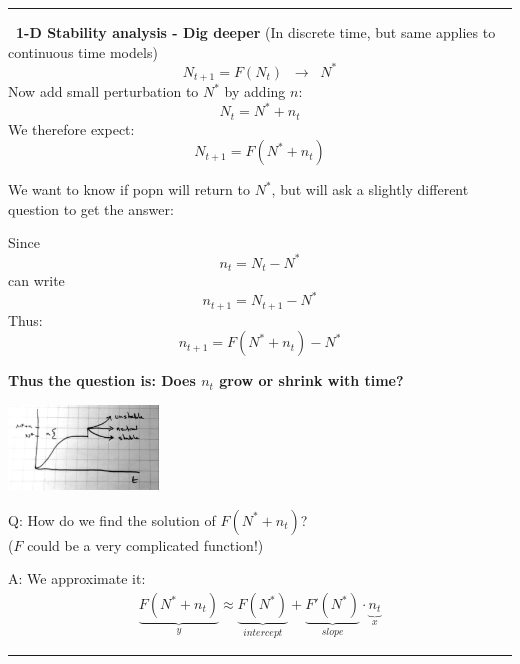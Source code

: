 \documentclass{article}
\newcommand{\ind}{\-\hspace{1cm}}
\begin{document}
\rule[0.5ex]{\linewidth}{1pt}

\textbf{ 1-D Stability analysis - Dig deeper}
(In discrete time, but same applies to continuous time models)
\begin{equation*}
	N_{t+1}=F(N_t) \; \; \to \;\; N^*
\end{equation*}
Now add small perturbation to $N^*$ by adding $n$:
\begin{equation*}
	N_t = N^* + n_t
\end{equation*}
We therefore expect:
\begin{equation*}
	N_{t+1} = F(N^* + n_t)
\end{equation*}

We want to know if popn will return to $N^*$, but will ask a slightly different question to get the answer:

\vspace{0.5cm}

Since 
\begin{equation*}
	n_t=N_t-N^*
\end{equation*}
can write
\begin{equation*}
	n_{t+1}=N_{t+1}-N^*
\end{equation*}
Thus:
\begin{equation*}
	n_{t+1} = F(N^* + n_t) - N^*
\end{equation*}

\begin{center}
	\textbf{Thus the question is:  Does $n_t$ grow or shrink with time?}
\end{center}

\begin{center}
\includegraphics[width=4cm]{figs/Perturb.pdf}
\end{center}

Q: How do we find the solution of $F(N^* + n_t)$?\\
\ind  ($F$ could be a very complicated function!)

A: We approximate it:
\begin{align*}
	\underbrace{F(N^* + n_t)}_y \approx \underbrace{F(N^*)}_{intercept}+ \underbrace{F'(N^*)}_{slope}  \cdot \underbrace{n_t}_x
\end{align*}

\rule[0.5ex]{\linewidth}{1pt}
\end{document}
